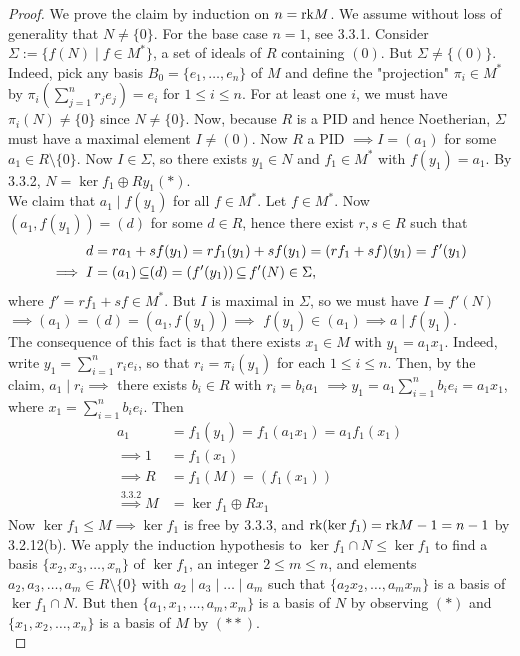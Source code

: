 \documentclass[11pt]{book}
\theoremstyle{definition}   \newtheorem{defn}[counter]{Definition} %
\newcommand{\bs}{\setminus}   \newcommand{\A}{\mathcal{A}}   \newcommand{\sy}{\textnormal{Syl}}   \newcommand{\size}[1]{\left| #1 \right|}
\numberwithin{counter}{chapter}
\begin{document}
\begin{proof}
We prove the claim by induction on $n = \textnormal{rk} M$. We assume without loss of generality that $N \ne \{0\}$. For the base case $n = 1$, see 3.3.1. Consider $\Sigma := \{f(N) \mid f \in M^*\}$, a set of ideals of $R$ containing $(0)$. But $\Sigma \ne \{(0)\}$. Indeed, pick any basis $B_0 = \{e_1,\dots,e_n\}$ of $M$ and define the "projection" $\pi_i \in M^*$ by $\pi_i(\sum_{j=1}^n r_j e_j) = e_i$ for $1 \leq i \leq n$. For at least one $i$, we must have $\pi_i(N) \ne \{0\}$ since $N \ne \{0\}$. Now, because $R$ is a PID and hence Noetherian, $\Sigma$ must have a maximal element $I \ne (0)$. Now $R$ a PID $\implies I = (a_1)$ for some $a_1 \in R \bs \{0\}$. Now $I \in \Sigma$, so there exists $y_1 \in N$ and $f_1 \in M^*$ with $f(y_1) = a_1$. By 3.3.2, $N = \ker f_1 \oplus Ry_1 (\ast)$. \\

We claim that $a_1 \mid f(y_1)$ for all $f \in M^*$. Let $f \in M^*$. Now $(a_1,f(y_1)) = (d)$ for some $d \in R$, hence there exist $r,s \in R$ such that
	\begin{align*}
	d &= ra_1 + s f(y_1) = r f_1(y_1) + s f(y_1) = (rf_1 + sf)(y_1) = f'(y_1) \\
	\implies I &= (a_1) \operatorname{\subseteq} (d) = (f'(y_1)) \operatorname{\subseteq} f'(N) \in \Sigma,
	\end{align*}
where $f' = rf_1 + sf \in M^*$. But $I$ is maximal in $\Sigma$, so we must have $I = f'(N)$ $\implies (a_1) = (d) = (a_1,f(y_1)) \implies $ $f(y_1) \in (a_1) \implies a \mid f(y_1)$. \\

The consequence of this fact is that there exists $x_1 \in M$ with $y_1 = a_1 x_1$. Indeed, write $y_1 = \sum_{i=1}^n r_i e_i$, so that $r_i = \pi_i(y_1)$ for each $1 \leq i \leq n$. Then, by the claim, $a_1 \mid r_i \implies$ there exists $b_i \in R$ with $r_i = b_i a_1 $ $\implies y_1 = a_1 \sum_{i=1}^n b_i e_i = a_1 x_1$, where $x_1 = \sum_{i=1}^n b_i e_i$. Then
	\begin{align*}
	a_1 &= f_1(y_1) = f_1(a_1x_1) = a_1 f_1(x_1) \\
	\implies 1 &= f_1(x_1) \\
	\implies R &= f_1(M) = (f_1(x_1)) \\
	\overset{3.3.2}{\implies} M &= \ker f_1 \oplus R x_1 \tag{$\ast \ast$}
	\end{align*}
Now $\ker f_1 \leq M \implies \ker f_1$ is free by 3.3.3, and $\textnormal{rk}(\ker f_1) = \textnormal{rk} M - 1 = n-1$ by 3.2.12(b). We apply the induction hypothesis to $\ker f_1 \cap N \leq \ker f_1$ to find a basis $\{x_2,x_3,\dots,x_n\}$ of $\ker f_1$, an integer $2 \leq m \leq n$, and elements $a_2,a_3,\dots,a_m \in R \bs \{0\}$ with $a_2 \mid a_3 \mid \dots \mid a_m$ such that $\{a_2x_2,\dots,a_mx_m\}$ is a basis of $\ker f_1 \cap N$. But then $\{a_1,x_1,\dots,a_m,x_m\}$ is a basis of $N$ by observing $(\ast)$ and $\{x_1,x_2,\dots,x_n\}$ is a basis of $M$ by $(\ast \ast)$. \\


\end{proof}
\end{document}
